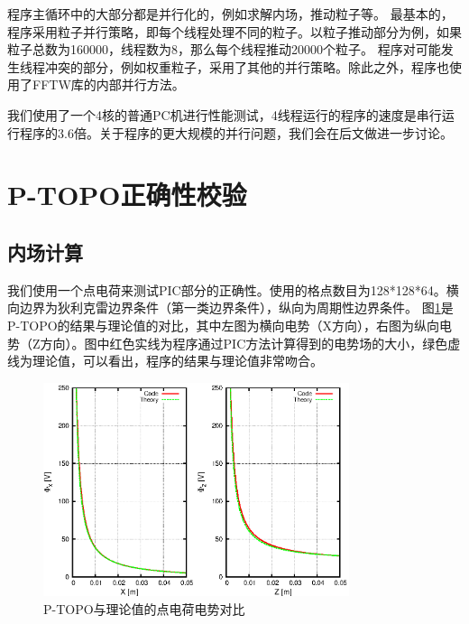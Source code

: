 程序主循环中的大部分都是并行化的，例如求解内场，推动粒子等。
最基本的，程序采用粒子并行策略，即每个线程处理不同的粒子。以粒子推动部分为例，如果粒子总数为160000，线程数为8，那么每个线程推动20000个粒子。
程序对可能发生线程冲突的部分，例如权重粒子，采用了其他的并行策略。除此之外，程序也使用了FFTW库的内部并行方法。



我们使用了一个4核的普通PC机进行性能测试，4线程运行的程序的速度是串行运行程序的3.6倍。关于程序的更大规模的并行问题，我们会在后文做进一步讨论。

\section{P-TOPO正确性校验}
\subsection{内场计算}
我们使用一个点电荷来测试PIC部分的正确性。使用的格点数目为128*128*64。横向边界为狄利克雷边界条件（第一类边界条件），纵向为周期性边界条件。
图\ref{fig:P_TOPO_verification1}是P-TOPO的结果与理论值的对比，其中左图为横向电势（X方向），右图为纵向电势（Z方向）。图中红色实线为程序通过PIC方法计算得到的电势场的大小，绿色虚线为理论值，可以看出，程序的结果与理论值非常吻合。

\begin{figure}[!htb]
    \centering
    \includegraphics[width=0.8\textwidth]{Img/P_TOPO_verification1.eps}
    \caption{P-TOPO与理论值的点电荷电势对比}
    \label{fig:P_TOPO_verification1}
\end{figure}

